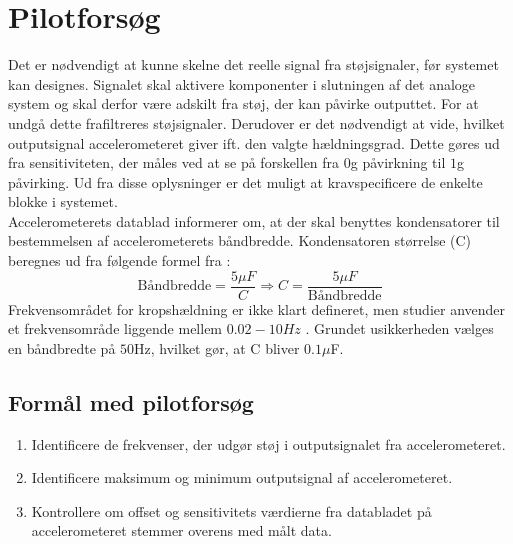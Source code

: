 \chapter{Pilotforsøg}\label{Bilag:Pilotforsoeg}
Det er nødvendigt at kunne skelne det reelle signal fra støjsignaler, før systemet kan designes. Signalet skal aktivere komponenter i slutningen af det analoge system og skal derfor være adskilt fra støj, der kan påvirke outputtet. For at undgå dette frafiltreres støjsignaler. Derudover er det nødvendigt at vide, hvilket outputsignal accelerometeret giver ift. den valgte hældningsgrad. Dette gøres ud fra sensitiviteten, der måles ved at se på forskellen fra $0$g påvirkning til $1$g påvirking. Ud fra disse oplysninger er det muligt at kravspecificere de enkelte blokke i systemet. \\ %
Accelerometerets datablad informerer om, at der skal benyttes kondensatorer til bestemmelsen af accelerometerets båndbredde. Kondensatoren størrelse (C) beregnes ud fra følgende formel fra \cite{Devices2009}:
\begin{equation}
\text{Båndbredde} = \dfrac{5\mu F}{C} \Rightarrow  C = \dfrac{5\mu F}{\text{Båndbredde}}
\end{equation}
Frekvensområdet for kropshældning er ikke klart defineret, men studier anvender et frekvensområde liggende mellem $0.02-10Hz$ \cite{Martinez-Mendez2011}. Grundet usikkerheden vælges en båndbredte på $50$Hz, hvilket gør, at C bliver $0.1\mu$F.

\section{Formål med pilotforsøg}
\begin{enumerate}
\item Identificere de frekvenser, der udgør støj i outputsignalet fra accelerometeret.
\item Identificere maksimum og minimum outputsignal af accelerometeret.
\item Kontrollere om offset og sensitivitets værdierne fra databladet på accelerometeret stemmer overens med målt data.
\end{enumerate}

